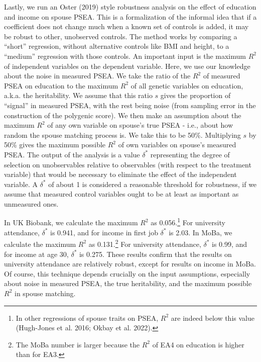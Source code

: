 \documentclass[
  12pt,
]{article}
\theoremstyle{definition}
\theoremstyle{definition}
\theoremstyle{definition}
\theoremstyle{definition}
\theoremstyle{remark}
\begin{document}
Lastly, we run an Oster (2019) style robustness analysis on
the effect of education and income on spouse PSEA. This is a
formalization of the informal idea that if a coefficient does not change
much when a known set of controls is added, it may be robust to other,
unobserved controls. The method works by comparing a ``short'' regression,
without alternative controls like BMI and height, to a ``medium''
regression with those controls. An important input is the maximum \(R^2\)
of independent variables on the dependent variable. Here, we use our
knowledge about the noise in measured PSEA. We take the ratio of the
\(R^2\) of measured PSEA on education to the maximum \(R^2\) of all genetic
variables on education, a.k.a. the heritability. We assume that this
ratio \(s\) gives the proportion of ``signal'' in measured PSEA, with the
rest being noise (from sampling error in the construction of the
polygenic score). We then make an assumption about the maximum \(R^2\) of
any own variable on spouse's true PSEA - i.e., about how random the
spouse matching process is. We take this to be 50\%. Multiplying \(s\) by
50\% gives the maximum possible \(R^2\) of own variables on spouse's
measured PSEA. The output of the analysis is a value \(\delta^*\)
representing the degree of selection on unobservables relative to
observables (with respect to the treatment variable) that would be
necessary to eliminate the effect of the independent variable. A
\(\delta^*\) of about 1 is considered a reasonable threshold for
robustness, if we assume that measured control variables ought to be at
least as important as unmeasured ones.

In UK Biobank, we calculate the maximum \(R^2\) as 0.056.\footnote{In other regressions of spouse traits on PSEA, \(R^2\) are indeed
  below this value (Hugh-Jones et al. 2016; {Okbay et al.} 2022).} For
university attendance, \(\delta^*\) is 0.941, and for income in
first job \(\delta^*\) is 2.03. In MoBa, we calculate the maximum
\(R^2\) as 0.131.\footnote{The MoBa number is larger because the \(R^2\) of EA4 on education
  is higher than for EA3.} For university attendance, \(\delta^*\) is
0.99, and for income at age 30, \(\delta^*\) is
0.275. These results confirm that the results on university
attendance are relatively robust, except for results on income in MoBa.
Of course, this technique depends crucially on the input assumptions,
especially about noise in measured PSEA, the true heritability, and the
maximum possible \(R^2\) in spouse matching.

\FloatBarrier
\end{document}
